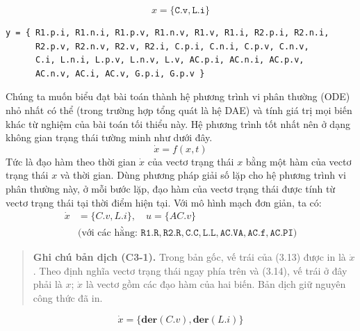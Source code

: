 \[x=\{\mathtt{C.v},\mathtt{L.i}\}\]
\begin{verbatim}
y = { R1.p.i, R1.n.i, R1.p.v, R1.n.v, R1.v, R1.i, R2.p.i, R2.n.i,
      R2.p.v, R2.n.v, R2.v, R2.i, C.p.i, C.n.i, C.p.v, C.n.v,
      C.i, L.n.i, L.p.v, L.n.v, L.v, AC.p.i, AC.n.i, AC.p.v,
      AC.n.v, AC.i, AC.v, G.p.i, G.p.v }
\end{verbatim}
Chúng ta muốn biểu đạt bài toán thành hệ phương trình vi phân thường (ODE) nhỏ nhất có thể (trong trường hợp tổng quát là hệ DAE) và tính giá trị mọi biến khác từ nghiệm của bài toán tối thiểu này. Hệ phương trình tốt nhất nên ở dạng không gian trạng thái tường minh như dưới đây.
\begin{equation}\dot{x}=f(x,t)\tag{3.12}\end{equation}
Tức là đạo hàm theo thời gian $\dot{x}$ của vectơ trạng thái $x$ bằng một hàm của vectơ trạng thái $x$ và thời gian. Dùng phương pháp giải số lặp cho hệ phương trình vi phân thường này, ở mỗi bước lặp, đạo hàm của vectơ trạng thái được tính từ vectơ trạng thái tại thời điểm hiện tại. Với mô hình mạch đơn giản, ta có:
\begin{equation}
\begin{aligned}
\dot{x}&=\{C.v,L.i\},\quad u=\{AC.v\}\\
&\text{(với các hằng: }\mathtt{R1.R},\mathtt{R2.R},\mathtt{C.C},\mathtt{L.L},\mathtt{AC.VA},\mathtt{AC.f},\mathtt{AC.PI}\text{)}
\end{aligned}\tag{3.13}
\end{equation}
\begin{quote}
\small\textbf{Ghi chú bản dịch (C3-1).} Trong bản gốc, vế trái của (3.13) được in là $\dot{x}$. Theo định nghĩa vectơ trạng thái ngay phía trên và (3.14), vế trái ở đây phải là $x$; $\dot{x}$ là vectơ gồm các đạo hàm của hai biến. Bản dịch giữ nguyên công thức đã in.
\end{quote}

\begin{equation}\dot{x}=\{\mathbf{der}(C.v),\mathbf{der}(L.i)\}\tag{3.14}\end{equation}

